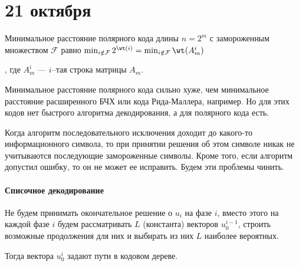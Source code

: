 \chapter{21 октября}

\begin{theorem}
    Минимальное расстояние полярного кода длины \(n = 2^m\)
    с замороженным множеством \(\mathcal{F}\) равно
    \(\min_{i \notin \mathcal{F}} 2^{\wt(i)} = \min_{i \notin \mathcal{F}} \wt(A_m^{i})\)
    
    , где \(A_m^i\) --- \(i\)--тая строка матрицы \(A_m\).
\end{theorem}

Минимальное расстояние полярного кода сильно хуже,
чем минимальное расстояние расширенного БЧХ или кода Рида-Маллера, например.
Но для этих кодов нет быстрого алгоритма декодирования,
а для полярного кода есть.

Когда алгоритм последовательного исключения доходит до какого-то
информационного символа, то при принятии решения об этом символе
никак не учитываются последующие замороженные символы.
Кроме того, если алгоритм допустил ошибку, то он не может
ее исправить.
Будем эти проблемы чинить.

\subsubsection{Списочное декодирование}

Не будем принимать окончательное решение о \(u_i\) на фазе \(i\),
вместо этого на каждой фазе \(i\) будем рассматривать \(L\) (константа)
векторов \(u^{i-1}_0\), строить возможные продолжения для них и выбирать
из них \(L\) наиболее вероятных.

Тогда вектора \(u_0^i\) задают пути в кодовом дереве.

\unfinished